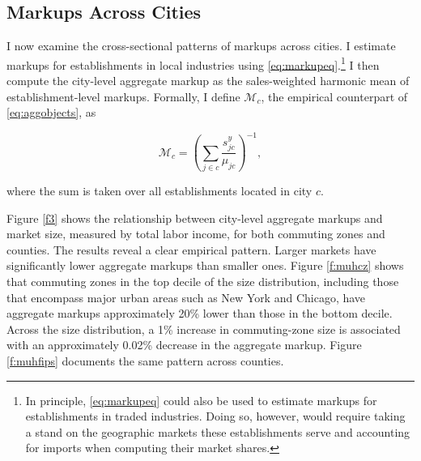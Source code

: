 \subsection{Markups Across Cities}
I now examine the cross-sectional patterns of markups across cities. I estimate markups for establishments in local industries using \eqref{eq:markupeq}.\footnote{In principle, \eqref{eq:markupeq} could also be used to estimate markups for establishments in traded industries. Doing so, however, would require taking a stand on the geographic markets these establishments serve and accounting for imports when computing their market shares.} I then compute the city-level aggregate markup as the sales-weighted harmonic mean of establishment-level markups. Formally, I define $\mathcal{M}_c$, the empirical counterpart of \eqref{eq:aggobjects}, as

\begin{equation}\label{eq:aggmu}
\mathcal{M}_c = \left( \sum_{j \in c} \frac{s_{jc}^y}{\mu_{jc}} \right)^{-1},
\end{equation}

where the sum is taken over all establishments located in city $c$.

Figure \ref{f3} shows the relationship between city-level aggregate markups and market size, measured by total labor income, for both commuting zones and counties. The results reveal a clear empirical pattern. Larger markets have significantly lower aggregate markups than smaller ones. Figure \ref{f:muhcz} shows that commuting zones in the top decile of the size distribution, including those that encompass major urban areas such as New York and Chicago, have aggregate markups approximately 20\% lower than those in the bottom decile. Across the size distribution, a 1\% increase in commuting-zone size is associated with an approximately 0.02\% decrease in the aggregate markup. Figure \ref{f:muhfips} documents the same pattern across counties.

